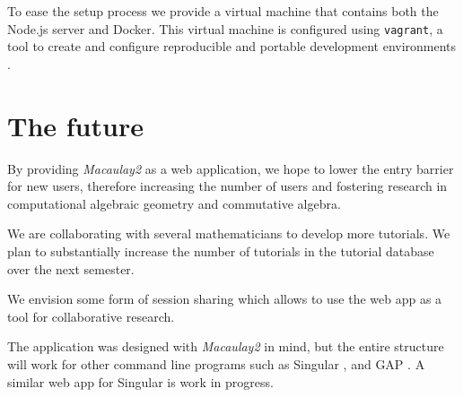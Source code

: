 \documentclass[twocolumn]{article}
\def\M2{{\it Macaulay2}}
\begin{document}
To ease the setup process we provide a virtual machine that contains both the Node.js server
and Docker. This virtual machine is configured using {\tt vagrant}, a tool to create and
configure reproducible and portable development environments \cite{vagrant}.

\section{The future}

By providing \M2 as a web application, we hope to lower the
 entry barrier for new users, therefore increasing the number 
 of users and fostering research in computational algebraic geometry and commutative algebra. 


We are collaborating with several mathematicians to develop more tutorials.
We plan to substantially increase the number of tutorials in the tutorial database over the next semester.


We envision some form of session sharing which allows to use the web app as a tool for collaborative research.


The application was designed with \M2 in mind, but
the entire structure will work for other command line programs such as Singular \cite{singular},
and GAP \cite{GAP4}. A similar web app for Singular is work in progress.




\end{document}
